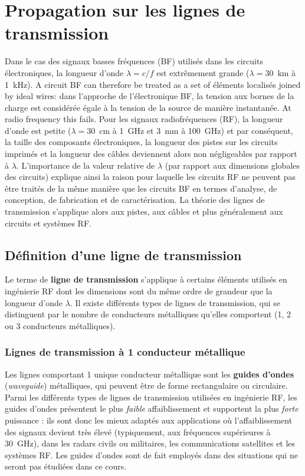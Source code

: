 \section{Propagation sur les lignes de transmission}
Dans le cas des signaux basses fréquences (BF) utilisés dans les circuits
électroniques, la longueur d'onde $\lambda = c/f$ est extrêmement grande
($\lambda = 30$~km à 1~kHz). A circuit BF can therefore be treated as a set of
éléments localisés joined by ideal wires: dans l'approche de l'électronique BF,
la tension aux bornes de la charge est considérée égale à la tension de la
source de manière instantanée. At radio frequency this fails. Pour les signaux
radiofréquences (RF), la longueur d'onde est petite ($\lambda = 30$~cm à 1~GHz
et 3~mm à 100~GHz) et par conséquent, la taille des composants électroniques,
la longueur des pistes sur les circuits imprimés et la longueur des câbles
deviennent alors non négligeables par rapport à $\lambda$. L'importance de la
valeur relative de $\lambda$ (par rapport aux dimensions globales des circuits)
explique ainsi la raison pour laquelle les circuits RF ne peuvent pas être
traités de la même manière que les circuits BF en termes d'analyse, de
conception, de fabrication et de caractérisation. La théorie des lignes de
transmission s'applique alors aux pistes, aux câbles et plus généralement aux
circuits et systèmes RF.

\subsection{Définition d'une ligne de transmission}
\begin{definition}
  Le terme de \textbf{ligne de transmission} s'applique à certains éléments
  utilisés en ingénierie RF dont les dimensions sont du même ordre de grandeur
  que la longueur d'onde $\lambda$. Il existe différents types de lignes de
  transmission, qui se distinguent par le nombre de conducteurs métalliques
  qu'elles comportent (1, 2 ou 3 conducteurs métalliques).
\end{definition}

\subsubsection{Lignes de transmission à 1 conducteur métallique}
Les lignes comportant 1 unique conducteur métallique sont les \textbf{guides
d'ondes} (\textit{waveguide}) métalliques, qui peuvent être de forme
rectangulaire ou circulaire. Parmi les différents types de lignes de
transmission utilisées en ingénierie RF, les guides d'ondes présentent le plus
\emph{faible} affaiblissement et supportent la plus \emph{forte} puissance : ils
sont donc les mieux adaptés aux applications où l'affaiblissement des signaux
devient très élevé (typiquement, aux fréquences supérieures à 30~GHz), dans les
radars civils ou militaires, les communications satellites et les systèmes RF.
Les guides d'ondes sont de fait employés dans des situations qui ne seront pas
étudiées dans ce cours.


